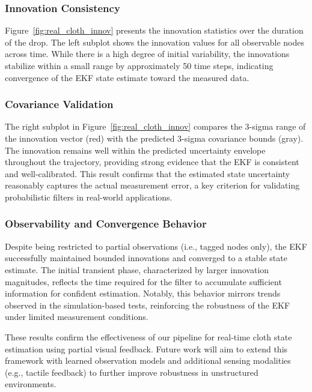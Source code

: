 \subsubsection*{Innovation Consistency}

Figure~\ref{fig:real_cloth_innov} presents the innovation statistics over the duration of the drop. The left subplot shows the innovation values for all observable nodes across time. While there is a high degree of initial variability, the innovations stabilize within a small range by approximately 50 time steps, indicating convergence of the EKF state estimate toward the measured data. 

\subsubsection*{Covariance Validation}

The right subplot in Figure~\ref{fig:real_cloth_innov} compares the 3-sigma range of the innovation vector (red) with the predicted 3-sigma covariance bounds (gray). The innovation remains well within the predicted uncertainty envelope throughout the trajectory, providing strong evidence that the EKF is consistent and well-calibrated. This result confirms that the estimated state uncertainty reasonably captures the actual measurement error, a key criterion for validating probabilistic filters in real-world applications.

\subsubsection*{Observability and Convergence Behavior}

Despite being restricted to partial observations (i.e., tagged nodes only), the EKF successfully maintained bounded innovations and converged to a stable state estimate. The initial transient phase, characterized by larger innovation magnitudes, reflects the time required for the filter to accumulate sufficient information for confident estimation. Notably, this behavior mirrors trends observed in the simulation-based tests, reinforcing the robustness of the EKF under limited measurement conditions.

These results confirm the effectiveness of our pipeline for real-time cloth state estimation using partial visual feedback. Future work will aim to extend this framework with learned observation models and additional sensing modalities (e.g., tactile feedback) to further improve robustness in unstructured environments.

